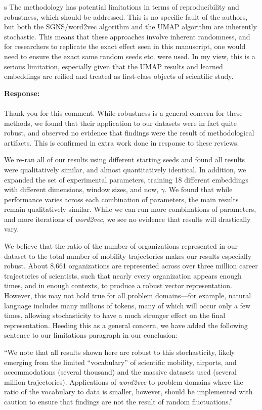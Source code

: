 \documentclass[12pt,draft,a4paper]{article}
\newcounter{comment}[subsection]
\newcommand{\response}[1]{{\noindent \textbf{Response:} \\ \\ \noindent #1}}
\newcommand{\rcomment}[1]{%
\vspace{10pt}
\begin{sectionbox}
s #1
\end{sectionbox}
}
\begin{document}
\rcomment{%
	The methodology has potential limitations in terms of reproducibility and robustness, which should be addressed. This is no specific fault of the authors, but both the SGNS/word2vec algorithm and the UMAP algorithm are inherently stochastic. This means that these approaches involve inherent randomness, and for researchers to replicate the exact effect seen in this manuscript, one would need to ensure the exact same random seeds etc. were used. In my view, this is a serious limitation, especially given that the UMAP results and learned embeddings are reified and treated as first-class objects of scientific study.
}

\response{Thank you for this comment. While robustness is a general concern for these methods, we found that their application to our datasets were in fact quite robust, and observed no evidence that findings were the result of methodological artifacts. This is confirmed in extra work done in response to these reviews.

	We re-ran all of our results using different starting seeds and found all results were qualitatively similar, and almost quantitatively identical.
	In addition, we expanded the set of experimental parameters, training 18 different embeddings with different dimensions, window sizes, and now, $\gamma$.
	We found that while performance varies across each combination of parameters, the main results remain qualitatively similar.
	While we can run more combinations of parameters, and more iterations of \textit{word2vec}, we see no evidence that results will drastically vary.

	We believe that the ratio of the number of organizations represented in our dataset to the total number of mobility trajectories makes our results especially robust.
	About 8,661 organizations are represented across over three million career trajectories of scientists, such that nearly every organization appears enough times, and in enough contexts, to produce a robust vector representation.
	However, this may not hold true for all problem domains—for example, natural language includes many millions of tokens, many of which will occur only a few times, allowing stochasticity to have a much stronger effect on the final representation.
	Heeding this as a general concern, we have added the following sentence to our limitations paragraph in our conclusion:

	“We note that all results shown here are robust to this stochasticity, likely emerging from the limited ``vocabulary'' of scientific mobility, airports, and accommodations (several thousand) and the massive datasets used (several million trajectories). Applications of \textit{word2vec} to problem domains where the ratio of the vocabulary to data is smaller, however, should be implemented with caution to ensure that findings are not the result of random fluctuations.”

}
\end{document}

